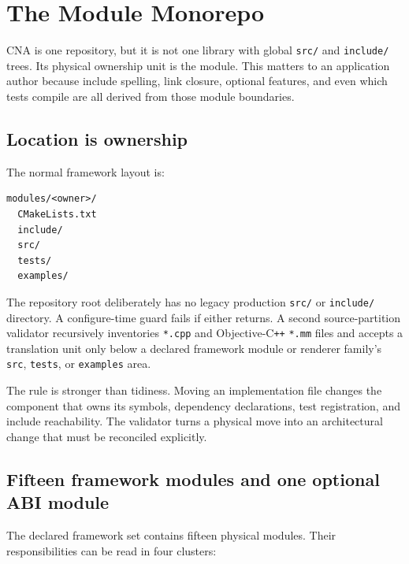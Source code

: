 \chapter{The Module Monorepo}
\label{ch:module-monorepo}

CNA is one repository, but it is not one library with global \texttt{src/} and
\texttt{include/} trees.  Its physical ownership unit is the module.  This matters to an
application author because include spelling, link closure, optional features, and even which tests
compile are all derived from those module boundaries.



\section{Location is ownership}

The normal framework layout is:

\begin{verbatim}
modules/<owner>/
  CMakeLists.txt
  include/
  src/
  tests/
  examples/
\end{verbatim}

The repository root deliberately has no legacy production \texttt{src/} or \texttt{include/}
directory.  A configure-time guard fails if either returns.  A second source-partition validator
recursively inventories \texttt{*.cpp} and Objective-C\texttt{++} \texttt{*.mm} files and accepts a
translation unit only below a declared framework module or renderer family's
\texttt{src}, \texttt{tests}, or \texttt{examples} area.

The rule is stronger than tidiness.  Moving an implementation file changes the component that owns
its symbols, dependency declarations, test registration, and include reachability.  The validator
turns a physical move into an architectural change that must be reconciled explicitly.

\section{Fifteen framework modules and one optional ABI module}

The declared framework set contains fifteen physical modules. Their responsibilities can be
read in four clusters:

